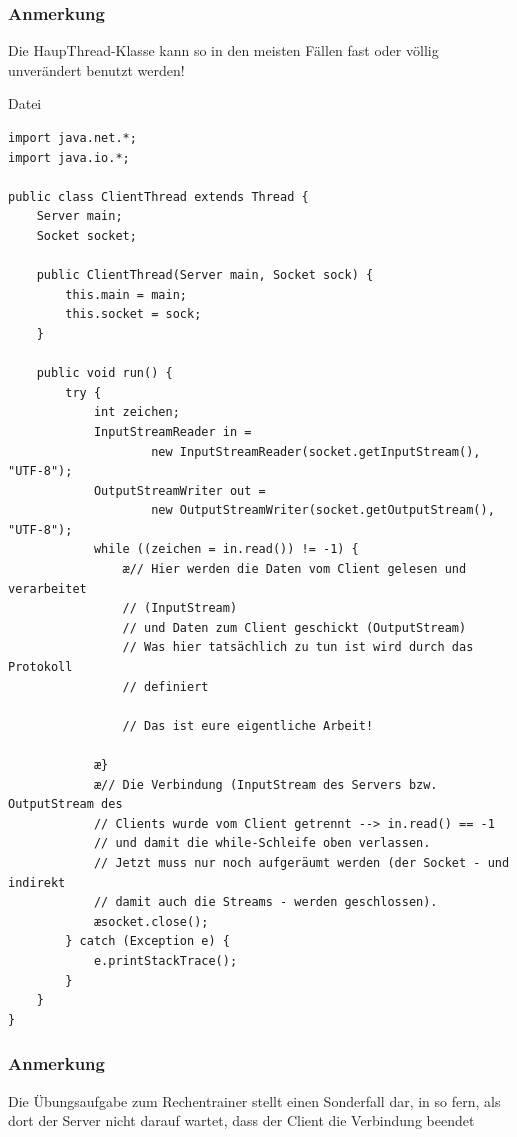 \subsubsection{Anmerkung}

Die HaupThread-Klasse kann so in den meisten Fällen fast oder völlig
unverändert benutzt werden!

\pagebreak

Datei 

\begin{lstlisting}
import java.net.*;
import java.io.*;

public class ClientThread extends Thread {
    Server main;
    Socket socket;

    public ClientThread(Server main, Socket sock) {
        this.main = main;
        this.socket = sock;
    }

    public void run() {
        try {
            int zeichen;
            InputStreamReader in = 
                    new InputStreamReader(socket.getInputStream(), "UTF-8");
            OutputStreamWriter out = 
                    new OutputStreamWriter(socket.getOutputStream(), "UTF-8");
            while ((zeichen = in.read()) != -1) {
                æ// Hier werden die Daten vom Client gelesen und verarbeitet
                // (InputStream)
                // und Daten zum Client geschickt (OutputStream)
                // Was hier tatsächlich zu tun ist wird durch das Protokoll
                // definiert

                // Das ist eure eigentliche Arbeit!

            æ}
            æ// Die Verbindung (InputStream des Servers bzw. OutputStream des
            // Clients wurde vom Client getrennt --> in.read() == -1
            // und damit die while-Schleife oben verlassen.
            // Jetzt muss nur noch aufgeräumt werden (der Socket - und indirekt
            // damit auch die Streams - werden geschlossen).
            æsocket.close();
        } catch (Exception e) {
            e.printStackTrace();
        }
    }
}
\end{lstlisting}

\subsubsection{Anmerkung}

Die Übungsaufgabe zum Rechentrainer stellt einen Sonderfall dar, in so fern,
als dort der Server nicht darauf wartet, dass der Client die Verbindung beendet

